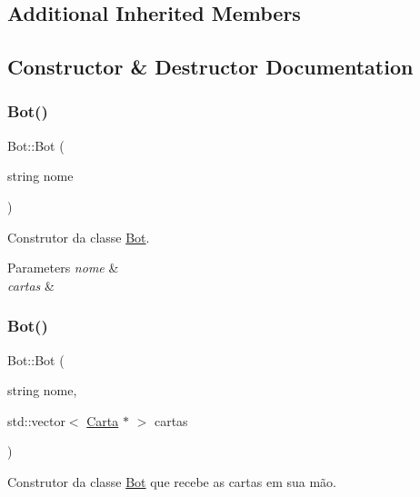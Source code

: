 \subsection*{Additional Inherited Members}


\subsection{Constructor \& Destructor Documentation}
\mbox{\label{class_bot_aaae843b6e580397800522406e583f1b0}} 
\subsubsection{\texorpdfstring{Bot()}{Bot()}\hspace{0.1cm}{\footnotesize\ttfamily [1/2]}}
{\footnotesize\ttfamily Bot\+::\+Bot (\begin{DoxyParamCaption}\item[{string}]{nome }\end{DoxyParamCaption})}



Construtor da classe \mbox{\hyperlink{class_bot}{Bot}}. 


\begin{DoxyParams}{Parameters}
{\em nome} & \\
\hline
{\em cartas} & \\
\hline
\end{DoxyParams}
\mbox{\label{class_bot_af86af144f9ce5174c99a83f9df2b4c86}} 
\subsubsection{\texorpdfstring{Bot()}{Bot()}\hspace{0.1cm}{\footnotesize\ttfamily [2/2]}}
{\footnotesize\ttfamily Bot\+::\+Bot (\begin{DoxyParamCaption}\item[{string}]{nome,  }\item[{std\+::vector$<$ \mbox{\hyperlink{class_carta}{Carta}} $\ast$ $>$}]{cartas }\end{DoxyParamCaption})}



Construtor da classe \mbox{\hyperlink{class_bot}{Bot}} que recebe as cartas em sua mão. 



